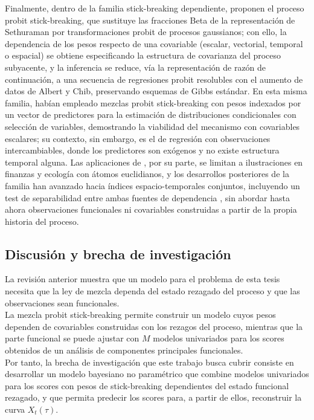 Finalmente, dentro de la familia stick-breaking dependiente, \citet{03_01_rodriguez2011probit} proponen el proceso probit stick-breaking, que sustituye las fracciones Beta de la representación de Sethuraman por transformaciones probit de procesos gaussianos; con ello, la dependencia de los pesos respecto de una covariable (escalar, vectorial, temporal o espacial) se obtiene especificando la estructura de covarianza del proceso subyacente, y la inferencia se reduce, vía la representación de razón de continuación, a una secuencia de regresiones probit resolubles con el aumento de datos de Albert y Chib, preservando esquemas de Gibbs estándar. En esta misma familia, \citet{03_02_chung2009nonparametric} habían empleado mezclas probit stick-breaking con pesos indexados por un vector de predictores para la estimación de distribuciones condicionales con selección de variables, demostrando la viabilidad del mecanismo con covariables escalares; su contexto, sin embargo, es el de regresión con observaciones intercambiables, donde los predictores son exógenos y no existe estructura temporal alguna. Las aplicaciones de \citet{03_01_rodriguez2011probit}, por su parte, se limitan a ilustraciones en finanzas y ecología con átomos euclidianos, y los desarrollos posteriores de la familia han avanzado hacia índices espacio-temporales conjuntos, incluyendo un test de separabilidad entre ambas fuentes de dependencia \citep{03_01_grazian2025spatiotemporal}, sin abordar hasta ahora observaciones funcionales ni covariables construidas a partir de la propia historia del proceso.
 
\subsection{Discusión y brecha de investigación}
\label{03_02_01_discusion_brecha}
La revisión anterior muestra que un modelo para el problema de esta tesis necesita que la ley de mezcla dependa del estado rezagado del proceso y que las observaciones sean funcionales.\\

La mezcla probit stick-breaking permite construir un modelo cuyos pesos dependen de covariables construidas con los rezagos del proceso, mientras que la parte funcional se puede ajustar con $M$ modelos univariados para los scores obtenidos de un análisis de componentes principales funcionales.\\

Por tanto, la brecha de investigación que este trabajo busca cubrir consiste en desarrollar un modelo bayesiano no paramétrico que combine modelos univariados para los scores con pesos de stick-breaking dependientes del estado funcional rezagado, y que permita predecir los scores para, a partir de ellos, reconstruir la curva $X_t(\tau)$.\\

